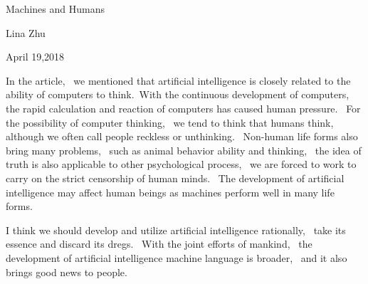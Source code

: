 \documentclass{article}
\begin{document}
	
	
	
	\begin{center}
		 Machines and Humans
	\end{center}
	\begin{center}
	Lina Zhu
	\end{center}
	\begin{center}
		April 19,2018
	\end{center}
	
	\par   In the article,~ we mentioned that artificial intelligence is closely related to the ability of computers to think.~With the continuous development of computers,~ the rapid calculation and reaction of computers has caused human pressure.~ For the possibility of computer thinking,~ we tend to think that humans think,~ although we often call people reckless or unthinking.~ Non-human life forms also bring many problems,~ such as animal behavior ability and thinking, ~the idea of truth is also applicable to other psychological process,~ we are forced to work to carry on the strict censorship of human minds.~ The development of artificial intelligence may affect human beings as machines perform well in many life forms.
\par I think we should develop and utilize artificial intelligence rationally,~ take its essence and discard its dregs. ~With the joint efforts of mankind,~ the development of artificial intelligence machine language is broader, ~and it also brings good news to people.
\end{document}
